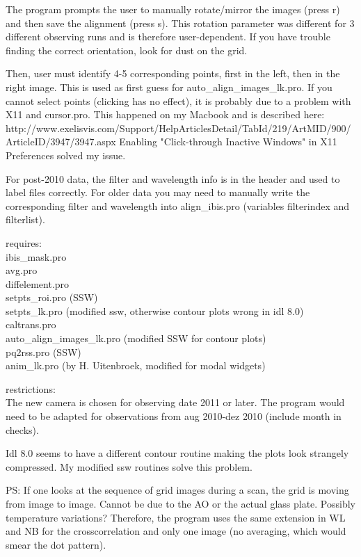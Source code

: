 \documentclass[a4paper,11pt]{article}
\begin{document}
The program prompts the user to manually rotate/mirror the images (press r) and then save the alignment (press s). This rotation parameter was different for 3 different observing runs and is therefore user-dependent. If you have trouble finding the correct orientation, look for dust on the grid.

Then, user must identify 4-5 corresponding points, first in the left,
then in the right image. This is used as first guess for
auto\_align\_images\_lk.pro. If you cannot select points (clicking has
no effect), it is probably due to a problem with X11 and cursor.pro. This happened on
my Macbook and is described here:\\
http://www.exelisvis.com/Support/HelpArticlesDetail/TabId/219/ArtMID/900/ArticleID/3947/3947.aspx
Enabling "Click-through Inactive Windows" in X11 Preferences solved my issue.

For post-2010 data, the filter and wavelength info is in the header and used to label files correctly. For older data you may need to manually write the corresponding filter and wavelength into align\_ibis.pro (variables filterindex and filterlist).


requires:\\
 ibis\_mask.pro\\
 avg.pro\\
 diffelement.pro\\
 setpts\_roi.pro (SSW)\\
 setpts\_lk.pro (modified ssw, otherwise contour plots wrong in idl 8.0)\\
 caltrans.pro\\
 auto\_align\_images\_lk.pro (modified SSW for contour plots)\\
 pq2rss.pro (SSW)\\
 anim\_lk.pro (by H. Uitenbroek, modified for modal widgets)


restrictions:\\
The new camera is chosen for observing date 2011 or later. The program
would need to be adapted for observations from aug 2010-dez 2010
 (include month in checks).

Idl 8.0 seems to have a different
contour routine making the plots look strangely compressed. My modified ssw routines
solve this problem.



PS: If one looks at the sequence of grid images during a scan, the grid is moving from image to image. Cannot be due to the AO or the actual glass plate. Possibly temperature variations? Therefore, the program uses the same extension in WL and NB for the crosscorrelation and only one image (no averaging, which would smear the dot pattern).
\end{document}
